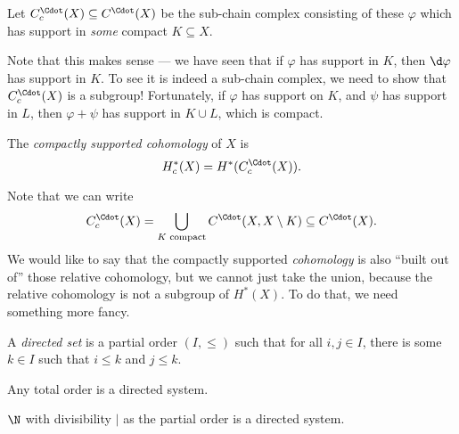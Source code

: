 \documentclass[a4paper]{article}
\theoremstyle{definition}
\begin{document}
\begin{defi}
  Let $C_c^\Cdot(X) \subseteq C^\Cdot(X)$ be the sub-chain complex consisting of these $\varphi$ which has support in \emph{some} compact $K \subseteq X$.
\end{defi}
Note that this makes sense --- we have seen that if $\varphi$ has support in $K$, then $\d \varphi$ has support in $K$. To see it is indeed a sub-chain complex, we need to show that $C_c^\Cdot(X)$ is a subgroup! Fortunately, if $\varphi$ has support on $K$, and $\psi$ has support in $L$, then $\varphi + \psi$ has support in $K \cup L$, which is compact.

\begin{defi}
  The \emph{compactly supported cohomology} of $X$ is
  \[
    H^*_c(X) = H^*(C_c^\Cdot(X)).
  \]
\end{defi}

Note that we can write
\[
  C_c^{\Cdot}(X) = \bigcup_{K\text{ compact}} C^\Cdot(X, X \setminus K) \subseteq C^\Cdot(X).
\]
We would like to say that the compactly supported \emph{cohomology} is also ``built out of'' those relative cohomology, but we cannot just take the union, because the relative cohomology is not a subgroup of $H^*(X)$. To do that, we need something more fancy.

\begin{defi}
  A \emph{directed set} is a partial order $(I, \leq)$ such that for all $i, j \in I$, there is some $k \in I$ such that $i \leq k$ and $j \leq k$.
\end{defi}

\begin{eg}
  Any total order is a directed system.
\end{eg}

\begin{eg}
  $\N$ with divisibility $\mid$ as the partial order is a directed system.
\end{eg}
\end{document}
